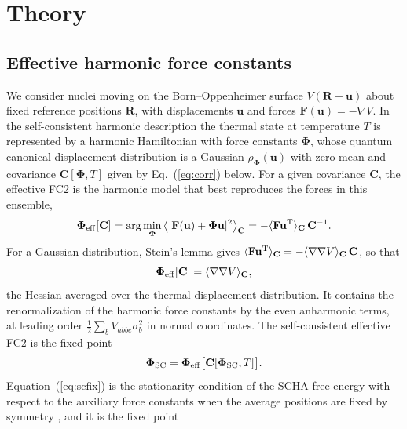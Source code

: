 \documentclass[aip,jap,reprint,amsmath,amssymb,floatfix]{revtex4-2}
\begin{document}
\section{Theory}\label{sec:theory}

\subsection{Effective harmonic force constants}\label{sec:effective}

We consider nuclei moving on the Born--Oppenheimer surface $V(\mathbf R+\mathbf
u)$ about fixed reference positions $\mathbf R$, with displacements
$\mathbf u$ and forces $\mathbf F(\mathbf u)=-\nabla V$. In the
self-consistent harmonic description the thermal state at temperature $T$ is
represented by a harmonic Hamiltonian with force constants
$\boldsymbol\Phi$, whose quantum canonical displacement distribution is a
Gaussian $\rho_{\boldsymbol\Phi}(\mathbf u)$ with zero mean and covariance
$\mathbf C[\boldsymbol\Phi,T]$ given by Eq.~(\ref{eq:corr}) below. For a
given covariance $\mathbf C$, the effective FC2 is the harmonic model that best
reproduces the forces in this ensemble,
\begin{equation}
\boldsymbol\Phi_{\rm eff}[\mathbf C]
=\arg\min_{\boldsymbol\Phi}\big\langle|\mathbf F(\mathbf u)
+\boldsymbol\Phi\mathbf u|^2\big\rangle_{\mathbf C}
=-\langle\mathbf F\mathbf u^{\rm T}\rangle_{\mathbf C}\,\mathbf C^{-1}.
\label{eq:phieff}
\end{equation}
For a Gaussian distribution, Stein's lemma \cite{ref61} gives
$\langle\mathbf F\mathbf u^{\rm T}\rangle_{\mathbf C}
=-\langle\nabla\nabla V\rangle_{\mathbf C}\,\mathbf C$, so that
\begin{equation}
\boldsymbol\Phi_{\rm eff}[\mathbf C]=\langle\nabla\nabla V\rangle_{\mathbf C},
\label{eq:hessian}
\end{equation}
the Hessian averaged over the thermal displacement distribution. It
contains the renormalization of the harmonic force constants by the even
anharmonic terms, at leading order
$\tfrac12\sum_bV_{abbe}\sigma_b^2$ in normal coordinates. The
self-consistent effective FC2 is the fixed point
\begin{equation}
\boldsymbol\Phi_{\rm SC}=\boldsymbol\Phi_{\rm eff}\big[\mathbf C[\boldsymbol\Phi_{\rm SC},T]\big].
\label{eq:scfix}
\end{equation}
Equation~(\ref{eq:scfix}) is the stationarity condition of the SCHA free
energy with respect to the auxiliary force constants when the average
positions are fixed by symmetry \cite{ref7,ref50}, and it is the fixed point
\end{document}
